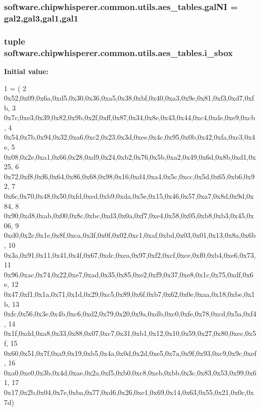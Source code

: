 \subsubsection[{gal\+N\+I}]{\setlength{\rightskip}{0pt plus 5cm}software.\+chipwhisperer.\+common.\+utils.\+aes\+\_\+tables.\+gal\+N\+I = {\bf gal2},{\bf gal3},{\bf gal1},{\bf gal1}}\label{namespacesoftware_1_1chipwhisperer_1_1common_1_1utils_1_1aes__tables_a1bebe9800fe6dfd3fc4c35d310db0539}
\hypertarget{namespacesoftware_1_1chipwhisperer_1_1common_1_1utils_1_1aes__tables_a58b699577981a13413d947ffc853b937}{}
\subsubsection[{i\+\_\+sbox}]{\setlength{\rightskip}{0pt plus 5cm}tuple software.\+chipwhisperer.\+common.\+utils.\+aes\+\_\+tables.\+i\+\_\+sbox}\label{namespacesoftware_1_1chipwhisperer_1_1common_1_1utils_1_1aes__tables_a58b699577981a13413d947ffc853b937}
{\bfseries Initial value\+:}
\begin{DoxyCode}
1 = (
2 0x52,0x09,0x6a,0xd5,0x30,0x36,0xa5,0x38,0xbf,0x40,0xa3,0x9e,0x81,0xf3,0xd7,0xfb,
3 0x7c,0xe3,0x39,0x82,0x9b,0x2f,0xff,0x87,0x34,0x8e,0x43,0x44,0xc4,0xde,0xe9,0xcb,
4 0x54,0x7b,0x94,0x32,0xa6,0xc2,0x23,0x3d,0xee,0x4c,0x95,0x0b,0x42,0xfa,0xc3,0x4e,
5 0x08,0x2e,0xa1,0x66,0x28,0xd9,0x24,0xb2,0x76,0x5b,0xa2,0x49,0x6d,0x8b,0xd1,0x25,
6 0x72,0xf8,0xf6,0x64,0x86,0x68,0x98,0x16,0xd4,0xa4,0x5c,0xcc,0x5d,0x65,0xb6,0x92,
7 0x6c,0x70,0x48,0x50,0xfd,0xed,0xb9,0xda,0x5e,0x15,0x46,0x57,0xa7,0x8d,0x9d,0x84,
8 0x90,0xd8,0xab,0x00,0x8c,0xbc,0xd3,0x0a,0xf7,0xe4,0x58,0x05,0xb8,0xb3,0x45,0x06,
9 0xd0,0x2c,0x1e,0x8f,0xca,0x3f,0x0f,0x02,0xc1,0xaf,0xbd,0x03,0x01,0x13,0x8a,0x6b,
10 0x3a,0x91,0x11,0x41,0x4f,0x67,0xdc,0xea,0x97,0xf2,0xcf,0xce,0xf0,0xb4,0xe6,0x73,
11 0x96,0xac,0x74,0x22,0xe7,0xad,0x35,0x85,0xe2,0xf9,0x37,0xe8,0x1c,0x75,0xdf,0x6e,
12 0x47,0xf1,0x1a,0x71,0x1d,0x29,0xc5,0x89,0x6f,0xb7,0x62,0x0e,0xaa,0x18,0xbe,0x1b,
13 0xfc,0x56,0x3e,0x4b,0xc6,0xd2,0x79,0x20,0x9a,0xdb,0xc0,0xfe,0x78,0xcd,0x5a,0xf4,
14 0x1f,0xdd,0xa8,0x33,0x88,0x07,0xc7,0x31,0xb1,0x12,0x10,0x59,0x27,0x80,0xec,0x5f,
15 0x60,0x51,0x7f,0xa9,0x19,0xb5,0x4a,0x0d,0x2d,0xe5,0x7a,0x9f,0x93,0xc9,0x9c,0xef,
16 0xa0,0xe0,0x3b,0x4d,0xae,0x2a,0xf5,0xb0,0xc8,0xeb,0xbb,0x3c,0x83,0x53,0x99,0x61,
17 0x17,0x2b,0x04,0x7e,0xba,0x77,0xd6,0x26,0xe1,0x69,0x14,0x63,0x55,0x21,0x0c,0x7d)
\end{DoxyCode}
\hypertarget{namespacesoftware_1_1chipwhisperer_1_1common_1_1utils_1_1aes__tables_ae93089d334185cfea043114defec83dd}{}
